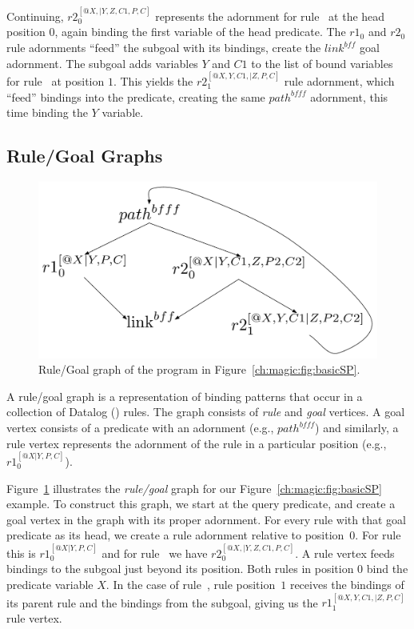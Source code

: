 Continuing, $r2_0^{[@X,|Y,Z,C1,P,C]}$ represents the adornment for rule~
at the head position $0$, again binding the first variable of the head
predicate.  The $r1_0$ and $r2_0$ rule adornments ``feed'' the 
subgoal with its bindings, create the $link^{bff}$ goal adornment.  The
 subgoal adds variables $Y$ and $C1$ to the list of bound variables
for rule~ at position $1$.  This yields the $r2_1^{[@X,Y,C1,|Z,P,C]}$
rule adornment, which ``feed'' bindings into the  predicate, creating
the same $path^{bfff}$ adornment, this time binding the $Y$ variable.

\subsection{Rule/Goal Graphs}

\begin{figure}[!t]
\begin{center}
\includegraphics[scale=0.5]{figures/RuleGoalGraph}
\caption{\label{ch:magic:fig:rggraph}Rule/Goal graph of the program in Figure~\ref{ch:magic:fig:basicSP}.}
\end{center}
\end{figure}

A rule/goal graph is a representation of binding patterns that occur in a
collection of Datalog (\OVERLOG) rules.  The graph consists of {\em rule} and
{\em goal} vertices.  A goal vertex consists of a predicate with an adornment
(e.g., $path^{bfff}$) and similarly, a rule vertex represents the adornment of
the rule in a particular position (e.g., $r1_0^{[@X|Y,P,C]}$).

Figure~\ref{ch:magic:fig:rggraph} illustrates the {\em rule/goal} graph for our
Figure~\ref{ch:magic:fig:basicSP} example.  To construct this graph, we start
at the query predicate, and create a goal vertex in the graph with its proper
adornment.  For every rule with that goal predicate as its head, we create a
rule adornment relative to position~$0$.  For rule~ this is
$r1_0^{[@X|Y,P,C]}$ and for rule~ we have $r2_0^{[@X,|Y,Z,C1,P,C]}$.  A
rule vertex feeds bindings to the subgoal just beyond its position.  Both rules
in position $0$ bind the  predicate variable $X$.  In the case of
rule~, rule position~$1$ receives the bindings of its parent rule and
the bindings from the  subgoal, giving us the
$r1_1^{[@X,Y,C1,|Z,P,C]}$ rule vertex.

